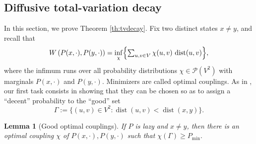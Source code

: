 \documentclass[10pt]{amsart}
\newtheorem{lemma}{Lemma}
\theoremstyle{definition}
\newcommand{\cP}{\mathcal{P}}
\newcommand{\pmin}{P_{\mathrm{min}}}
\DeclareMathOperator{\dist}{dist}
\begin{document}
\subsection{Diffusive total-variation decay}
\label{sec:tvdecay}
In this section, we prove Theorem \ref{th:tvdecay}. Fix two distinct states $x\ne y$, and recall that
\begin{equation*}
W\left(P(x,\cdot),P(y,\cdot)\right) = \inf_{\chi}\Bigl\{\textstyle\sum_{u,v\in V}\chi(u,v)\,\dist(u,v)\Bigr\},
\end{equation*}
where the infimum runs over all probability distributions $\chi\in\cP(V^2)$ with marginals $P(x,\cdot)$ and $P(y,\cdot)$. Minimizers are called optimal couplings. As in \cite{MR2316551,munch2019non}, our first task consists in showing that they can be chosen so as to assign a ``decent'' probability to the ``good'' set
\begin{equation*}
\Gamma := \bigl\{(u,v)\in V^2\colon \dist(u,v)<\dist(x,y) \bigr\}.
\end{equation*}
\begin{lemma}[Good optimal couplings] \label{lm:coupling}If $P$ is lazy and $x\ne y$, then there is an optimal coupling $\chi$ of $P(x,\cdot),P(y,\cdot)$ such that $\chi\left(\Gamma\right) \ge \pmin.$
\end{lemma}
\end{document}
